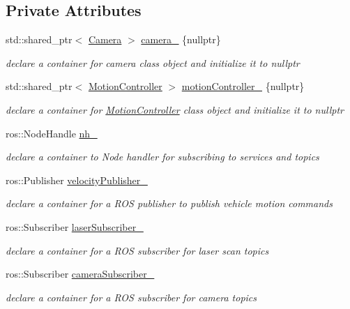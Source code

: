 \subsection*{Private Attributes}
\begin{DoxyCompactItemize}
\item 
std\+::shared\+\_\+ptr$<$ \hyperlink{classCamera}{Camera} $>$ \hyperlink{classNaivik_a59456579fab04d7c934dc8826d36821b}{camera\+\_\+} \{nullptr\}
\begin{DoxyCompactList}\small\item\em declare a container for camera class object and initialize it to nullptr \end{DoxyCompactList}\item 
std\+::shared\+\_\+ptr$<$ \hyperlink{classMotionController}{Motion\+Controller} $>$ \hyperlink{classNaivik_a96923f306061a14093c74c5700c1bb8a}{motion\+Controller\+\_\+} \{nullptr\}
\begin{DoxyCompactList}\small\item\em declare a container for \hyperlink{classMotionController}{Motion\+Controller} class object and initialize it to nullptr \end{DoxyCompactList}\item 
ros\+::\+Node\+Handle \hyperlink{classNaivik_af964150f253e4cbaa15bcd1537511af9}{nh\+\_\+}
\begin{DoxyCompactList}\small\item\em declare a container to Node handler for subscribing to services and topics \end{DoxyCompactList}\item 
ros\+::\+Publisher \hyperlink{classNaivik_aaaea1b99cc7f9c6d317e57516564aac9}{velocity\+Publisher\+\_\+}
\begin{DoxyCompactList}\small\item\em declare a container for a R\+OS publisher to publish vehicle motion commands \end{DoxyCompactList}\item 
ros\+::\+Subscriber \hyperlink{classNaivik_a0f001e2ba2dcd1ca7c2fa92eff2c1562}{laser\+Subscriber\+\_\+}
\begin{DoxyCompactList}\small\item\em declare a container for a R\+OS subscriber for laser scan topics \end{DoxyCompactList}\item 
ros\+::\+Subscriber \hyperlink{classNaivik_ab37285b13d04a193f38b2d05a3303694}{camera\+Subscriber\+\_\+}
\begin{DoxyCompactList}\small\item\em declare a container for a R\+OS subscriber for camera topics \end{DoxyCompactList}\item 

\end{DoxyCompactItemize}
